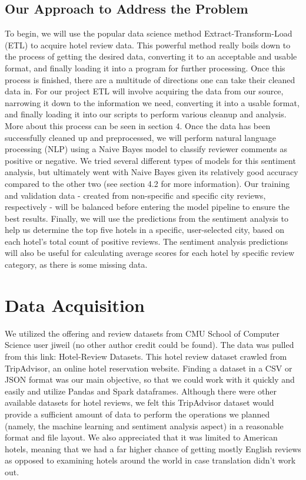 \documentclass[conference]{IEEEtran}
\begin{document}
	\subsection{Our Approach to Address the Problem}
	To begin, we will use the popular data science method Extract-Transform-Load (ETL) to acquire hotel review data. This powerful method really boils down to the process of getting the desired data, converting it to an acceptable and usable format, and finally loading it into a program for further processing. Once this process is finished, there are a multitude of directions one can take their cleaned data in. For our project ETL will involve acquiring the data from our source, narrowing it down to the information we need, converting it into a usable format, and finally loading it into our scripts to perform various cleanup and analysis. More about this process can be seen in section 4.
	Once the data has been successfully cleaned up and preprocessed, we will perform natural language processing (NLP) using a Naive Bayes model to classify reviewer comments as positive or negative. We tried several different types of models for this sentiment analysis, but ultimately went with Naive Bayes given its relatively good accuracy compared to the other two (see section 4.2 for more information). Our training and validation data - created from non-specific and specific city reviews, respectively - will be balanced before entering the model pipeline to ensure the best results.
	Finally, we will use the predictions from the sentiment analysis to help us determine the top five hotels in a specific, user-selected city, based on each hotel’s total count of positive reviews. The sentiment analysis predictions will also be useful for calculating average scores for each hotel by specific review category, as there is some missing data.
	
	\section{Data Acquisition}
	We utilized the offering and review datasets from CMU School of Computer Science user jiweil (no other author credit could be found). The data was pulled from this link: Hotel-Review Datasets. This hotel review dataset crawled from TripAdvisor, an online hotel reservation website. Finding a dataset in a CSV or JSON format was our main objective, so that we could work with it quickly and easily and utilize Pandas and Spark dataframes.
	Although there were other available datasets for hotel reviews, we felt this TripAdvisor dataset would provide a sufficient amount of data to perform the operations we planned (namely, the machine learning and sentiment analysis aspect) in a reasonable format and file layout. We also appreciated that it was limited to American hotels, meaning that we had a far higher chance of getting mostly English reviews as opposed to examining hotels around the world in case translation didn’t work out.
	
\end{document}
